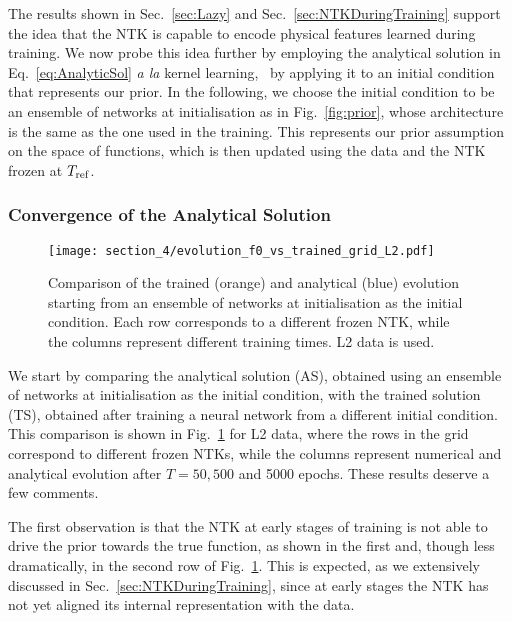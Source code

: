 The results shown in Sec.~\ref{sec:Lazy} and Sec.~\ref{sec:NTKDuringTraining}
support the idea that the NTK is capable to encode physical features learned
during training. We now probe this idea further by employing the analytical
solution in Eq.~\eqref{eq:AnalyticSol} \textit{a la} kernel learning, \ie\ by
applying it to an initial condition that represents our prior. In the following,
we choose the initial condition to be an ensemble of networks at initialisation
as in Fig.~\ref{fig:prior}, whose architecture is the same as the one used in
the training. This represents our prior assumption on the space of functions,
which is then updated using the data and the NTK frozen at $T_{\rm ref}$.

\subsubsection{Convergence of the Analytical Solution}
\begin{figure}[t]
  \centering
  \texttt{[image: section\_4/evolution\_f0\_vs\_trained\_grid\_L2.pdf]} 
  \caption{Comparison of the trained (orange) and analytical (blue) evolution
  starting from an ensemble of networks at initialisation as the initial
  condition. Each row corresponds to a different frozen NTK, while the columns
  represent different training times. L2 data is used.}
  \label{fig:EvolutionGridF0L2}
\end{figure}
We start by comparing the analytical solution (AS), obtained using an ensemble
of networks at initialisation as the initial condition, with the trained
solution (TS), obtained after training a neural network from a different initial
condition. This comparison is shown in Fig.~\ref{fig:EvolutionGridF0L2} for L2
data, where the rows in the grid correspond to different frozen NTKs, while the
columns represent numerical and analytical evolution after $T=50, 500$ and 5000
epochs. These results deserve a few comments.

The first observation is that the NTK at early stages of training is not able to
drive the prior towards the true function, as shown in the first and, though
less dramatically, in the second row of Fig.~\ref{fig:EvolutionGridF0L2}. This
is expected, as we extensively discussed in Sec.~\ref{sec:NTKDuringTraining},
since at early stages the NTK has not yet aligned its internal representation
with the data.

